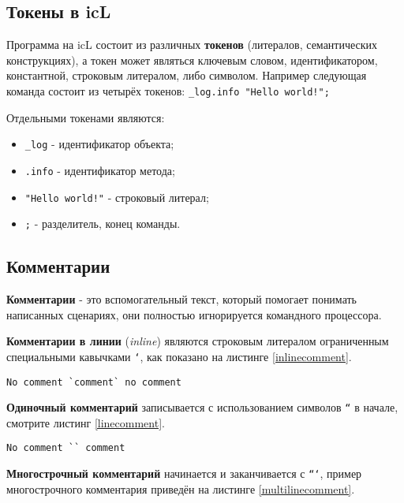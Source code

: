 \documentclass[a4paper, 14pt]{extarticle}
\newenvironment{icItems}
	{ \begin{itemize} [noitemsep,nolistsep] }
	{ \end{itemize} }
\begin{document}
\subsection{Токены в icL}

Программа на icL состоит из различных \textbf{токенов} (литералов, семантических конструкциях), а токен может являться ключевым словом, идентификатором, константной, строковым литералом, либо символом. Например следующая команда состоит из четырёх токенов: \lstinline`_log.info "Hello world!";`

Отдельными токенами являются:

\begin{icItems}
\item
	\lstinline`_log` - идентификатор объекта;
\item
	\lstinline`.info` - идентификатор метода;
\item
	\lstinline`"Hello world!"` - строковый литерал;
\item
	\lstinline`;` - разделитель, конец команды.
\end{icItems}

\subsection{Комментарии}

\textbf{Комментарии} - это вспомогательный текст, который помогает понимать написанных сценариях, они полностью игнорируется командного процессора.

\textbf{Комментарии в линии} (\textit{inline}) являются строковым литералом ограниченным специальными кавычками \texttt{`}, как показано на листинге \ref{inlinecomment}.

\begin{lstlisting}[caption=Комментарий в линии,label=inlinecomment]
No comment `comment` no comment
\end{lstlisting}

\textbf{Одиночный комментарий} записывается с использованием символов \texttt{``} в начале, смотрите листинг \ref{linecomment}.

\begin{lstlisting}[caption=Одиночный комментарий,label=linecomment]
No comment `` comment
\end{lstlisting}

\textbf{Многострочный комментарий} начинается и заканчивается с \texttt{```}, пример многострочного комментария приведён на листинге \ref{multilinecomment}.
\end{document}
